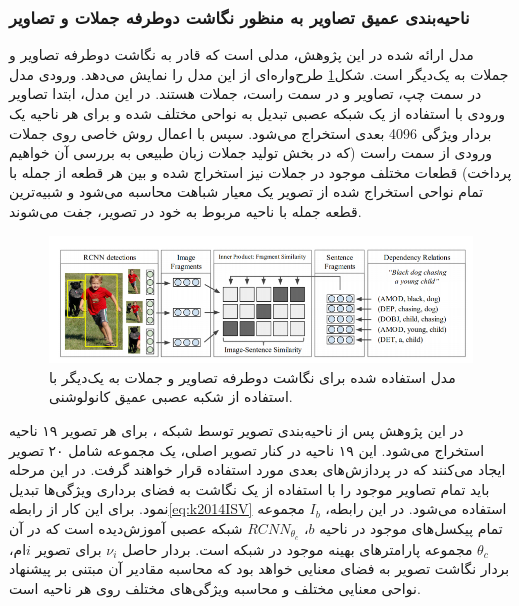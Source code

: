 \subsubsection[ناحیه‌بندی عمیق تصاویر به منظور نگاشت دوطرفه جملات و تصاویر]{ناحیه‌بندی عمیق تصاویر به منظور نگاشت دوطرفه جملات و تصاویر\cite{karpathy2014deep}}

مدل ارائه شده در این پژوهش، مدلی است که قادر به نگاشت دوطرفه تصاویر و جملات به یک‌دیگر است. شکل\ref{fig:k2014DM} طرح‌واره‌ای از این مدل را نمایش می‌دهد. ورودی مدل در سمت چپ، تصاویر و در سمت راست، جملات هستند. در این مدل، ابتدا تصاویر ورودی با استفاده از یک شبکه عصبی  تبدیل به نواحی مختلف شده و برای هر ناحیه یک بردار ویژگی 4096 بعدی استخراج می‌شود. سپس با اعمال روش خاصی روی جملات ورودی از سمت راست (که در بخش تولید جملات زبان طبیعی به بررسی آن خواهیم پرداخت) قطعات مختلف موجود در جملات نیز استخراج شده و بین هر قطعه از جمله با تمام نواحی استخراج شده از تصویر یک معیار شباهت محاسبه می‌شود و شبیه‌ترین قطعه جمله با ناحیه مربوط به خود در تصویر، جفت می‌شوند.

\begin{figure}[H]
\center
\includegraphics[scale=0.6]{./Imgs/karpathy2014deep_model.png}
\caption[طرح‌واره عملکرد روش ]{مدل استفاده شده برای نگاشت دو‌طرفه تصاویر و جملات به یک‌دیگر با استفاده از شکبه‌ عصبی عمیق کانولوشنی.\cite{karpathy2014deep}}
\label{fig:k2014DM}
\end{figure}

در این پژوهش پس از ناحیه‌بندی تصویر توسط شبکه ، برای هر تصویر ۱۹ ناحیه استخراج می‌شود. این ۱۹ ناحیه در کنار تصویر اصلی، یک مجموعه شامل ۲۰ تصویر ایجاد می‌کنند که در پردازش‌های بعدی مورد استفاده قرار خواهند گرفت. در این مرحله باید تمام تصاویر موجود را با استفاده از یک نگاشت به فضای برداری ویژگی‌ها تبدیل نمود. برای این کار از رابطه\ref{eq:k2014ISV}
استفاده می‌شود. در این رابطه، $I_b$ مجموعه تمام پیکسل‌های موجود در ناحیه $b$،
$RCNN_{\theta_c}$
شبکه عصبی آموزش‌دیده است که در آن $\theta_c$ مجموعه پارامترهای بهینه موجود در شبکه است. بردار حاصل $\nu_i$ برای تصویر $i$ام، بردار نگاشت تصویر به فضای معنایی خواهد بود که محاسبه مقادیر آن مبتنی بر پیشنهاد نواحی معنایی مختلف و محاسبه ويژگی‌های مختلف روی هر ناحیه است.


